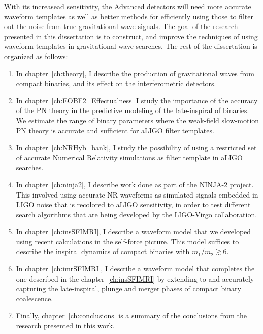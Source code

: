 With its increasead sensitivity, the Advanced detectors will need more accurate
waveform templates as well as better methods for efficiently using those to 
filter out the noise from true gravitational wave signals. 
The goal of the research presented in this dissertation is to construct, and
improve the techniques of using waveform templates in gravitational wave searches. 
The rest of the dissertation is organized as follows:
\begin{enumerate}
 \item In chapter~\ref{ch:theory}, I describe the production of gravitational
 waves from compact binaries, and its effect on the interferometric detectors.
 \item In chapter~\ref{ch:EOBF2_Effectualness} 
 I study the importance of the accuracy of the PN theory in the predictive 
 modeling of the late-inspiral of binaries. We estimate the range of binary 
 parameters where the weak-field slow-motion PN theory is accurate and 
 sufficient for aLIGO filter templates.
 \item In chapter~\ref{ch:NRHyb_bank}, I study the possibility of using a
 restricted set of accurate Numerical Relativity simulations as filter template
 in aLIGO searches. 
 \item In chapter~\ref{ch:ninja2}, I describe work done as part of the 
 NINJA-2 project. This involved using accurate NR waveforms as simulated
 signals embedded in LIGO noise that is recolored to aLIGO sensitivity, in
 order to test different search algorithms that are being developed by the
 LIGO-Virgo collaboration.
 \item In chapter~\ref{ch:insSFIMRI}, I describe a waveform model that we 
 developed using recent calculations in the self-force picture. This model 
 suffices to describe the inspiral dynamics of compact binaries with 
 $m_1/m_2\gtrsim 6$.
 \item In chapter~\ref{ch:imrSFIMRI}, I describe a waveform model that 
 completes the one described in the chapter~\ref{ch:insSFIMRI} by extending to 
 and accurately capturing the late-inspiral, plunge and merger phases of 
 compact binary coalescence. 
 \item Finally, chapter~\ref{ch:conclusions} is a summary of the conclusions
 from the research presented in this work.
\end{enumerate}




